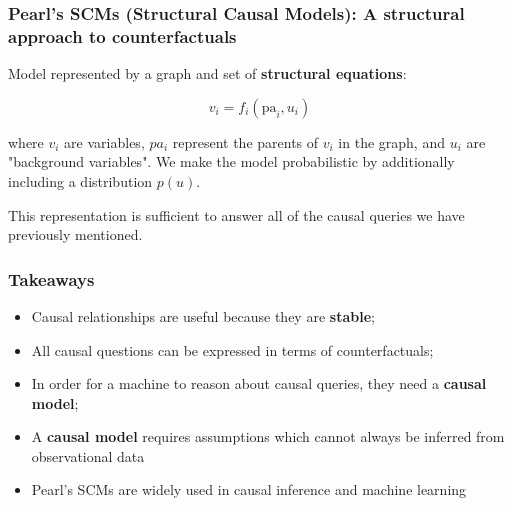 \documentclass[handout]{beamer}
\begin{document}
\begin{frame}
\frametitle{Pearl's SCMs (Structural Causal Models): A structural approach to counterfactuals}

Model represented by a graph and set of \textbf{structural equations}:
\pause

$$v_i = f_i(\text{pa}_i, u_i)$$
\pause

where $v_i$ are variables, $pa_i$ represent the parents of $v_i$ in the graph, and $u_i$ are "background variables". We make the model probabilistic by additionally including a distribution $p(u)$.
\pause

\bigskip
This representation is sufficient to answer all of the causal queries we have previously mentioned.
\pause



\end{frame}

\begin{frame}
\frametitle{Takeaways}
\begin{itemize}
	\item Causal relationships are useful because they are \textbf{stable};
	\item All causal questions can be expressed in terms of counterfactuals;
	\item In order for a machine to reason about causal queries, they need a \textbf{causal model};
	\item A \textbf{causal model} requires assumptions which cannot always be inferred from observational data
	\item Pearl's SCMs are widely used in causal inference and machine learning
\end{itemize}
\end{frame}


\end{document}
